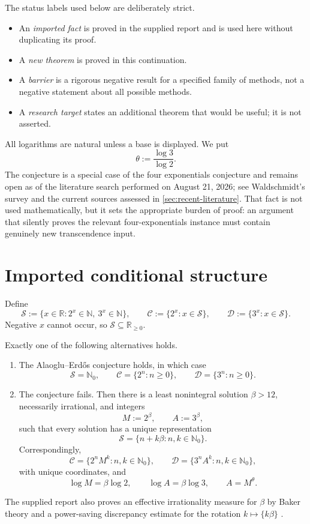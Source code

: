 \documentclass[11pt,oneside]{article}
\theoremstyle{definition}
\theoremstyle{remark}
\newcommand{\N}{\mathbb N}
\newcommand{\Nzero}{\mathbb N_0}
\newcommand{\R}{\mathbb R}
\newcommand{\Sol}{\mathcal S}
\newcommand{\Cand}{\mathcal C}
\newcommand{\Out}{\mathcal D}
\begin{document}
The status labels used below are deliberately strict.
\begin{itemize}
  \item An \emph{imported fact} is proved in the supplied report and is used here without duplicating its proof.
  \item A \emph{new theorem} is proved in this continuation.
  \item A \emph{barrier} is a rigorous negative result for a specified family of methods, not a negative statement about all possible methods.
  \item A \emph{research target} states an additional theorem that would be useful; it is not asserted.
\end{itemize}

All logarithms are natural unless a base is displayed.  We put
\[
  \theta:=\frac{\log3}{\log2}.
\]
The conjecture is a special case of the four exponentials conjecture and remains open as of the literature search performed on August 21, 2026; see Waldschmidt's survey \cite{Waldschmidt2023} and the current sources assessed in \cref{sec:recent-literature}.  That fact is not used mathematically, but it sets the appropriate burden of proof: an argument that silently proves the relevant four-exponentials instance must contain genuinely new transcendence input.

\section{Imported conditional structure}
\label{sec:imported}

Define
\[
  \Sol:=\{x\in\R:2^x\in\N,\ 3^x\in\N\},
  \qquad
  \Cand:=\{2^x:x\in\Sol\},
  \qquad
  \Out:=\{3^x:x\in\Sol\}.
\]
Negative $x$ cannot occur, so $\Sol\subseteq\R_{\ge0}$.

\begin{statusbox}
Exactly one of the following alternatives holds.
\begin{enumerate}[label=\textup{(\roman*)}]
  \item The Alaoglu--Erd\H{o}s conjecture holds, in which case
  \[
    \Sol=\Nzero,\qquad \Cand=\{2^n:n\ge0\},\qquad \Out=\{3^n:n\ge0\}.
  \]
  \item The conjecture fails.  Then there is a least nonintegral solution $\beta>12$, necessarily irrational, and integers
  \[
    M:=2^\beta,\qquad A:=3^\beta,
  \]
  such that every solution has a unique representation
  \[
    \Sol=\{n+k\beta:n,k\in\Nzero\}.
  \]
  Correspondingly,
  \[
    \Cand=\{2^nM^k:n,k\in\Nzero\},\qquad
    \Out=\{3^nA^k:n,k\in\Nzero\},
  \]
  with unique coordinates, and
  \[
    \log M=\beta\log2,\qquad \log A=\beta\log3,
    \qquad A=M^\theta.
  \]
\end{enumerate}
The supplied report also proves an effective irrationality measure for $\beta$ by Baker theory and a power-saving discrepancy estimate for the rotation $k\mapsto\{k\beta\}$ \cite{UnifiedReport}.
\end{statusbox}
\end{document}
